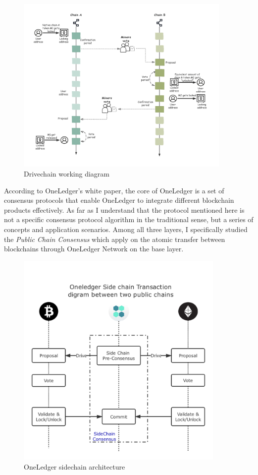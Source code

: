         \begin{figure}[H]
        \includegraphics[width=0.93\textwidth]{./figures/drive.png}
        \centering
        \caption{Drivechain  working diagram}%
        \centering
        \label{fig:drive}
        \end{figure}
\noindent According to OneLedger's white paper, the core of OneLedger is a set of consensus protocols that enable OneLedger to integrate different blockchain products effectively. As far as I understand that the protocol mentioned here is not a specific consensus protocol algorithm in the traditional sense, but a series of concepts and application scenarios. Among all three layers, I specifically studied the \textit{Public Chain Consensus} which apply on the atomic transfer between blockchains through OneLedger Network on the base layer.
        \begin{figure}[H]
        \includegraphics[width=0.9\textwidth]{./figures/oneledger.png}
        \centering
        \caption{OneLedger sidechain architecture}
        \centering
        \label{fig:oneledger}
        
        \end{figure}
